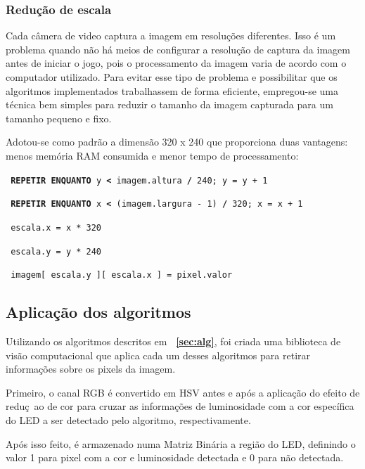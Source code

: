 \documentclass[12pt]{article}
\begin{document}
\subsubsection{Redu\c c\~ao de escala}
Cada c\^amera de video captura a imagem em resolu\c c\~oes diferentes. Isso \'e um problema quando n\~ao h\'a
meios de configurar a resolu\c c\~ao de captura da imagem antes de iniciar o jogo, pois o processamento da imagem
varia de acordo com o computador utilizado. Para evitar esse tipo de problema e possibilitar que os algoritmos implementados
trabalhassem de forma eficiente, empregou-se uma t\'ecnica bem simples para reduzir
o tamanho da imagem capturada para um tamanho pequeno e fixo.
 
Adotou-se como padr\~ao a dimens\~ao 320 x 240 que proporciona duas vantagens: menos mem\'oria RAM consumida
 e menor tempo de processamento:

\noindent \texttt{\footnotesize{ \textbf{REPETIR ENQUANTO} y \textbf{<} imagem.altura \textbf{/} 240; y = y + 1} }

\hspace{0.2cm} \texttt{\footnotesize{ \textbf{REPETIR ENQUANTO} x \textbf{<} (imagem.largura - 1) \textbf{/} 320; x = x + 1}}

\hspace{0.4cm} \texttt{\footnotesize{ escala.x = x * 320}}

\hspace{0.4cm} \texttt{\footnotesize{ escala.y = y * 240}}

\hspace{0.4cm} \texttt{\footnotesize{ imagem[ escala.y ][ escala.x ] = pixel.valor}}
\vspace{0.5cm}

\subsection{Aplica\c c\~ao dos algoritmos}
Utilizando os algoritmos descritos em \textbf{~\ref{sec:alg}}, foi criada uma biblioteca de vis\~ao computacional que aplica cada um desses
algoritmos para retirar informa\c c\~oes sobre os pixels da imagem.

Primeiro, o canal RGB \'e convertido em HSV antes e ap\'os a aplica\c c\~ao do efeito de redu\c c~ao de cor para
cruzar as informa\c c\~oes de luminosidade com a cor espec\'ifica do LED a ser detectado pelo algoritmo, respectivamente.

Ap\'os isso feito, \'e armazenado numa Matriz Bin\'aria a regi\~ao do LED, definindo o valor 1 para pixel com
a cor e luminosidade detectada e 0 para n\~ao detectada.
\end{document}
